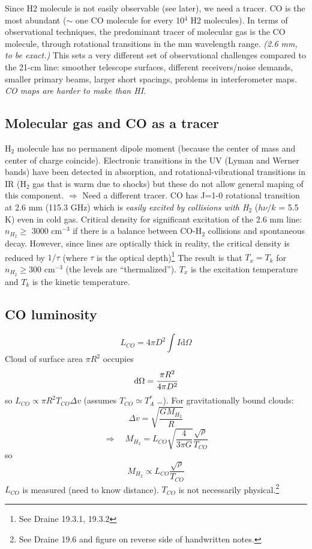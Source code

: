 \documentclass[12pt]{article}
\newcommand{\mar}[1]{\hspace{0pt}\marginpar{-\textcolor{black}{#1}-}}
\newcommand{\mynotes}[1]{{\fontfamily{cmss}\selectfont \textit{#1}}}
\begin{document}
Since H2 molecule is not
easily observable (see later), we need a tracer. CO is the most abundant
($\sim$ one CO molecule for every 10$^{4}$ H2 molecules). In terms of
observational techniques, the predominant tracer of molecular gas is the
CO molecule, through rotational transitions in the mm wavelength range.
\mynotes{(2.6 mm, to be exact.)}
This sets a very different set of observational challenges compared to the
21-cm line: smoother telescope surfaces, different receivers/noise demands,
smaller primary beams, larger short spacings, problems in interferometer
maps. \mynotes{CO maps are harder to make than HI.}

\subsection{Molecular gas and CO as a tracer}
\mar{128}H$_{2}$ molecule has no permanent dipole moment (because the
center of mass and center of charge coincide). Electronic transitions in the
UV (Lyman and Werner bands) have been detected in absorption, and
rotational-vibrational transitions in IR (H$_{2}$ gas that is warm due to shocks)
but these do not allow general maping of this component.
$\Rightarrow$ Need a different tracer. CO has J=1-0 rotational transition
at 2.6 mm (115.3 GHz) which is \emph{easily excited by collisions with
H$_{2}$} ($h\nu/k$ = 5.5 K) even in cold gas. Critical density for
significant excitation of the 2.6 mm line:
$n_{H_{2}} \geq$ 3000 cm$^{-3}$ if there is a balance between CO-H$_{2}$
collisions and spontaneous decay. However, since lines are optically thick
in reality, the critical density is reduced by $1/\tau$ (where $\tau$ is the
optical depth)\footnote{
    See Draine 19.3.1, 19.3.2}
The result is that $T_{x} = T_{k}$ for $n_{H_{2}} \geq 300$ cm$^{-3}$
(the levels are ``thermalized''). $T_{x}$ is the excitation temperature and
$T_{k}$ is the kinetic temperature.

\subsection{CO luminosity}
\mar{130}
\[
    L_{CO} = 4{\pi}D^{2} \int{ I \mathrm{d}\Omega }
    \]
Cloud of surface area ${\pi}R^{2}$ occupies
\[
    \mathrm{d}\Omega = \cfrac{{\pi}R^{2}}{4{\pi}D^{2}}
    \]
so $L_{CO} \propto {\pi}R^{2} T_{CO} {\Delta}v$
(assumes $T_{CO} \simeq T_{A}^{*}$ \ldots).
For gravitationally bound clouds:
\[
    {\Delta}v = \sqrt{ \frac{GM_{H_{2}}}{R} }
    \]
\[
    \Longrightarrow \quad
    M_{H_{2}} = L_{CO} \sqrt{ \frac{4}{3{\pi}G} } \frac{\sqrt{\rho}}{T_{CO}}
    \]
so
\[
    M_{H_{2}} \propto L_{CO} \frac{\sqrt{\rho}}{T_{CO}}
    \]
$L_{CO}$ is measured (need to know distance). $T_{CO}$ is not necessarily
physical.\footnote{
    See Draine 19.6 and figure on reverse side of handwritten notes.}
\end{document}
